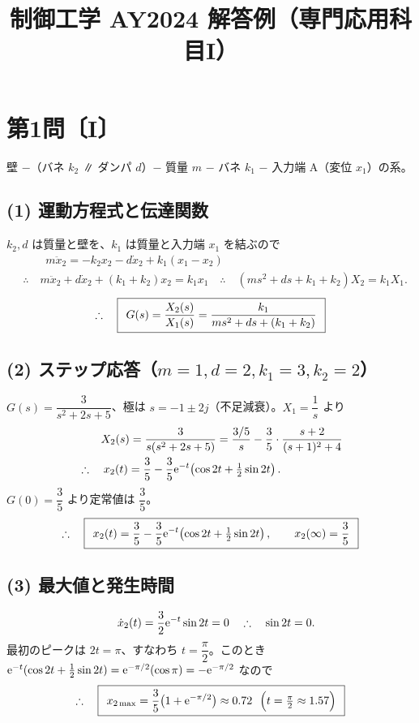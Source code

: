 \documentclass[11pt,a4paper]{article}
\title{制御工学 AY2024 解答例（専門応用科目I）}
\author{}
\date{}
\begin{document}
\maketitle

\section*{第1問〔I〕}

壁 $-$（バネ $k_2$ ∥ ダンパ $d$）$-$ 質量 $m$ $-$ バネ $k_1$ $-$ 入力端 A（変位 $x_1$）の系。

\subsection*{(1) 運動方程式と伝達関数}
$k_2,d$ は質量と壁を、$k_1$ は質量と入力端 $x_1$ を結ぶので
\begin{align*}
  &\qquad m\ddot{x}_2=-k_2 x_2-d\dot{x}_2+k_1(x_1-x_2)\\
  &\therefore\quad m\ddot{x}_2+d\dot{x}_2+(k_1+k_2)x_2=k_1 x_1
   \quad\therefore\quad (ms^2+ds+k_1+k_2)X_2=k_1 X_1.
\end{align*}
\[
  \therefore\quad \boxed{\,\;G(s)=\dfrac{X_2(s)}{X_1(s)}=\dfrac{k_1}{ms^2+ds+(k_1+k_2)}\;\,}
\]

\subsection*{(2) ステップ応答（$m=1,d=2,k_1=3,k_2=2$）}
$G(s)=\dfrac{3}{s^2+2s+5}$、極は $s=-1\pm2j$（不足減衰）。$X_1=\dfrac1s$ より
\begin{align*}
  &\qquad X_2(s)=\frac{3}{s(s^2+2s+5)}=\frac{3/5}{s}-\frac{3}{5}\cdot\frac{s+2}{(s+1)^2+4}\\
  &\therefore\quad x_2(t)=\frac35-\frac35\mathrm{e}^{-t}\!\left(\cos2t+\tfrac12\sin2t\right).
\end{align*}
$G(0)=\dfrac35$ より定常値は $\dfrac35$。
\[
  \therefore\quad \boxed{\,\;x_2(t)=\frac35-\frac35\mathrm{e}^{-t}\!\left(\cos2t+\tfrac12\sin2t\right),\qquad x_2(\infty)=\frac35\;\,}
\]

\subsection*{(3) 最大値と発生時間}
\begin{align*}
  &\qquad \dot{x}_2(t)=\frac32\mathrm{e}^{-t}\sin2t=0
   \quad\therefore\quad \sin2t=0.
\end{align*}
最初のピークは $2t=\pi$、すなわち $t=\dfrac{\pi}{2}$。このとき $\mathrm{e}^{-t}(\cos2t+\tfrac12\sin2t)=\mathrm{e}^{-\pi/2}(\cos\pi)=-\mathrm{e}^{-\pi/2}$ なので
\[
  \therefore\quad \ans{\;x_{2\max}=\frac35\bigl(1+\e^{-\pi/2}\bigr)\approx0.72\ \ \Bigl(t=\tfrac{\pi}{2}\approx1.57\Bigr)\;}
\]
\end{document}
